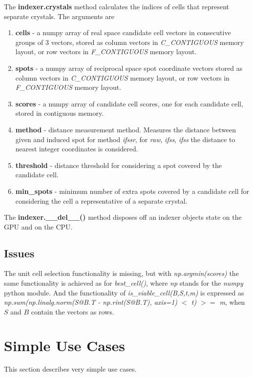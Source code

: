 \documentclass[a4paper,10pt]{article}
\begin{document}
The \textbf{indexer.crystals} method calculates the indices of cells that represent separate crystals. The arguments are
%
\begin{enumerate}
 \item \textbf{cells} - a numpy array of real space candidate cell vectors in consecutive groups of 3 vectors, stored as column vectors in \emph{C\_CONTIGUOUS} memory layout, or row vectors in \emph{F\_CONTIGUOUS} memory layout.
 \item \textbf{spots} - a numpy array of reciprocal space spot coordinate vectors stored as column vectors in \emph{C\_CONTIGUOUS} memory layout, or row vectors in \emph{F\_CONTIGUOUS} memory layout.
 \item \textbf{scores} - a numpy array of candidate cell scores, one for each candidate cell, stored in contiguous memory.
 \item \textbf{method} - distance measurement method. Measures the distance between given and induced spot for method \emph{ifssr}, for \emph{raw}, \emph{ifss}, \emph{ifss} the distance to nearest integer coordinates is considered.
 \item \textbf{threshold} - distance threshold for considering a spot covered by the candidate cell.
 \item \textbf{min\_spots} - minimum number of extra spots covered by a candidate cell for considering the cell a representative of a separate crystal.
\end{enumerate}

The \textbf{indexer.\_\_del\_\_()} method disposes off an indexer objects state on the GPU and on the CPU.

\subsection{Issues}

The unit cell selection functionality is missing, but with \emph{np.argmin(scores)} the same functionality is achieved as for \emph{best\_cell()}, where \emph{np} stands for the \emph{numpy} python module. And the functionality of \emph{is\_viable\_cell(B,S,t,m)} is expressed as \emph{np.sum(np.linalg.norm(S@B.T - np.rint(S@B.T), axis=1) $<$ t) $>=$ m}, when $S$ and $B$ contain the vectors as rows.

\section{Simple Use Cases}

This section describes very simple use cases.
\end{document}
